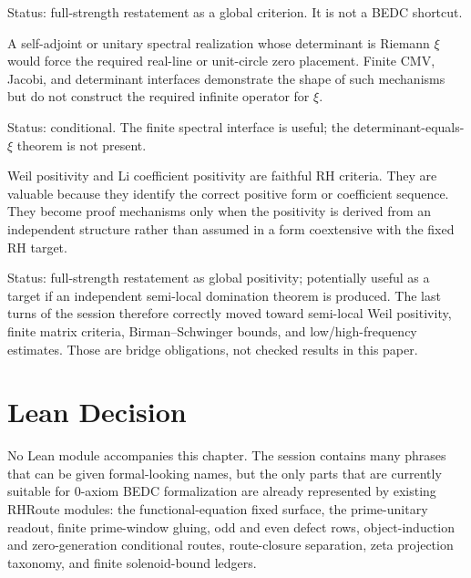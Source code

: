 Status: full-strength restatement as a global criterion.  It is not a BEDC
shortcut.

\begin{principle}
\label{prin:rh-ledger-hilbert-polya-audit}
A self-adjoint or unitary spectral realization whose determinant is
Riemann $\xi$ would force the required real-line or unit-circle zero
placement.  Finite CMV, Jacobi, and determinant interfaces demonstrate the
shape of such mechanisms but do not construct the required infinite
operator for $\xi$.
\end{principle}

Status: conditional.  The finite spectral interface is useful; the
determinant-equals-$\xi$ theorem is not present.

\begin{principle}
\label{prin:rh-ledger-weil-li-audit}
Weil positivity and Li coefficient positivity are faithful RH criteria.
They are valuable because they identify the correct positive form or
coefficient sequence.  They become proof mechanisms only when the positivity
is derived from an independent structure rather than assumed in a form
coextensive with the fixed RH target.
\end{principle}

Status: full-strength restatement as global positivity; potentially useful as a
target if an independent semi-local domination theorem is produced.  The
last turns of the session therefore correctly moved toward semi-local Weil
positivity, finite matrix criteria, Birman--Schwinger bounds, and
low/high-frequency estimates.  Those are bridge obligations, not checked
results in this paper.

\section{Lean Decision}
\label{sec:rh-ledger-lean-decision}

No Lean module accompanies this chapter.  The session contains many
phrases that can be given formal-looking names, but the only parts that are
currently suitable for 0-axiom BEDC formalization are already represented by
existing RHRoute modules: the functional-equation fixed surface, the
prime-unitary readout, finite prime-window gluing, odd and even defect
rows, object-induction and zero-generation conditional routes, route-closure
separation, zeta projection taxonomy, and finite solenoid-bound ledgers.

